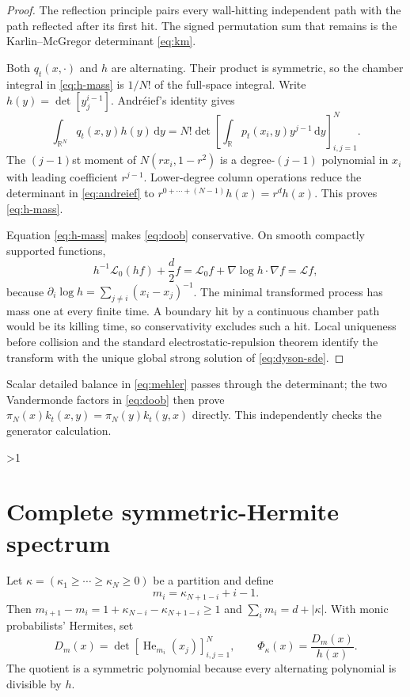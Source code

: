\documentclass[10pt]{article}
\newcommand{\RR}{\mathbb R}
\newcommand{\dd}{\,\mathrm d}
\begin{document}
\begin{proof}
The reflection principle pairs every wall-hitting independent path with the
path reflected after its first hit.  The signed permutation sum that remains
is the Karlin--McGregor determinant \eqref{eq:km}.

Both $q_t(x,\cdot)$ and $h$ are alternating.  Their product is symmetric, so
the chamber integral in \eqref{eq:h-mass} is $1/N!$ of the full-space
integral.  Write $h(y)=\det[y_j^{i-1}]$.  Andr\'eief's identity gives
\begin{equation}
 \int_{\RR^N}q_t(x,y)h(y)\dd y
 =N!\det[\int_{\RR}p_t(x_i,y)y^{j-1}\dd y]_{i,j=1}^N.
                                                        \label{eq:andreief}
\end{equation}
The $(j-1)$st moment of $N(rx_i,1-r^2)$ is a degree-$(j-1)$ polynomial in
$x_i$ with leading coefficient $r^{j-1}$.  Lower-degree column operations
reduce the determinant in \eqref{eq:andreief} to
$r^{0+\cdots+(N-1)}h(x)=r^dh(x)$.  This proves \eqref{eq:h-mass}.

Equation \eqref{eq:h-mass} makes \eqref{eq:doob} conservative.  On smooth
compactly supported functions,
\begin{equation}
 h^{-1}\mathcal L_0(hf)+\frac d2f
 =\mathcal L_0f+\nabla\log h\cdot\nabla f=\mathcal Lf, \label{eq:conjugacy}
\end{equation}
because $\partial_i\log h=\sum_{j\ne i}(x_i-x_j)^{-1}$.  The minimal
transformed process has mass one at every finite time.  A boundary hit by a
continuous chamber path would be its killing time, so conservativity excludes
such a hit.  Local uniqueness before collision and the standard
electrostatic-repulsion theorem identify the transform with the unique global
strong solution of \eqref{eq:dyson-sde}.
\end{proof}

Scalar detailed balance in \eqref{eq:mehler} passes through the determinant;
the two Vandermonde factors in \eqref{eq:doob} then prove
$\pi_N(x)k_t(x,y)=\pi_N(y)k_t(y,x)$ directly.  This independently checks the
generator calculation.
\fi

\ifnum\CRevisionRound>1
\section{Complete symmetric-Hermite spectrum}

Let $\kappa=(\kappa_1\geq\cdots\geq\kappa_N\geq0)$ be a partition and define
\begin{equation}
 m_i=\kappa_{N+1-i}+i-1.                              \label{eq:m-index}
\end{equation}
Then $m_{i+1}-m_i=1+\kappa_{N-i}-\kappa_{N+1-i}\geq1$ and
$\sum_i m_i=d+|\kappa|$.  With monic probabilists' Hermites, set
\begin{equation}
 D_m(x)=\det[\operatorname{He}_{m_i}(x_j)]_{i,j=1}^N,
 \qquad \Phi_\kappa(x)=\frac{D_m(x)}{h(x)}.            \label{eq:phi}
\end{equation}
The quotient is a symmetric polynomial because every alternating polynomial
is divisible by $h$.
\end{document}
